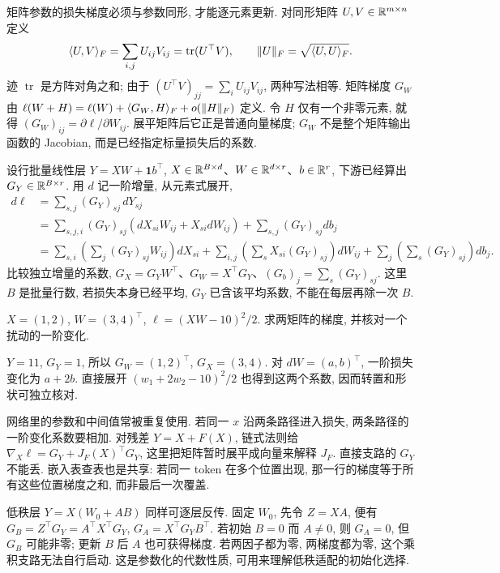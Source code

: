 \label{sec:frobenius}
矩阵参数的损失梯度必须与参数同形, 才能逐元素更新. 对同形矩阵 $U,V\in\mathbb R^{m\times n}$ 定义
\[
\langle U,V\rangle_F=\sum_{i,j}U_{ij}V_{ij}
=\operatorname{tr}(U^\top V),\qquad \lVert U\rVert_F=\sqrt{\langle U,U\rangle_F}.
\]
迹 $\operatorname{tr}$ 是方阵对角之和; 由于 $(U^\top V)_{jj}=\sum_iU_{ij}V_{ij}$, 两种写法相等. 矩阵梯度 $G_W$ 由
$\ell(W+H)=\ell(W)+\langle G_W,H\rangle_F+o(\lVert H\rVert_F)$
定义. 令 $H$ 仅有一个非零元素, 就得 $(G_W)_{ij}=\partial\ell/\partial W_{ij}$. 展平矩阵后它正是普通向量梯度; $G_W$ 不是整个矩阵输出函数的 Jacobian, 而是已经指定标量损失后的系数.

设行批量线性层 $Y=XW+\mathbf1b^\top$, $X\in\mathbb R^{B\times d}$、$W\in\mathbb R^{d\times r}$、$b\in\mathbb R^r$, 下游已经算出 $G_Y\in\mathbb R^{B\times r}$. 用 $d$ 记一阶增量, 从元素式展开,
\begin{align*}
d\ell&=\sum_{s,j}(G_Y)_{sj}\,dY_{sj}\\
&=\sum_{s,j,i}(G_Y)_{sj}(dX_{si}W_{ij}+X_{si}dW_{ij})
 +\sum_{s,j}(G_Y)_{sj}db_j\\
&=\sum_{s,i}\left(\sum_j(G_Y)_{sj}W_{ij}\right)dX_{si}
+\sum_{i,j}\left(\sum_sX_{si}(G_Y)_{sj}\right)dW_{ij}
+\sum_j\left(\sum_s(G_Y)_{sj}\right)db_j.
\end{align*}
比较独立增量的系数,
$G_X=G_YW^\top$、$G_W=X^\top G_Y$、$(G_b)_j=\sum_s(G_Y)_{sj}$.
这里 $B$ 是批量行数, 若损失本身已经平均, $G_Y$ 已含该平均系数, 不能在每层再除一次 $B$.

\begin{example}
$X=(1,2)$, $W=(3,4)^\top$, $\ell=(XW-10)^2/2$. 求两矩阵的梯度, 并核对一个扰动的一阶变化.
\end{example}
\begin{solution}
$Y=11$, $G_Y=1$, 所以 $G_W=(1,2)^\top$, $G_X=(3,4)$. 对 $dW=(a,b)^\top$, 一阶损失变化为 $a+2b$. 直接展开 $(w_1+2w_2-10)^2/2$ 也得到这两个系数, 因而转置和形状可独立核对.
\end{solution}
网络里的参数和中间值常被重复使用. 若同一 $x$ 沿两条路径进入损失, 两条路径的一阶变化系数要相加. 对残差 $Y=X+F(X)$, 链式法则给
$\nabla_X\ell=G_Y+J_F(X)^\top G_Y$, 这里把矩阵暂时展平成向量来解释 $J_F$. 直接支路的 $G_Y$ 不能丢. 嵌入表查表也是共享: 若同一 token 在多个位置出现, 那一行的梯度等于所有这些位置梯度之和, 而非最后一次覆盖.

低秩层 $Y=X(W_0+AB)$ 同样可逐层反传. 固定 $W_0$, 先令 $Z=XA$, 便有
$G_B=Z^\top G_Y=A^\top X^\top G_Y$,
$G_A=X^\top G_YB^\top$.
若初始 $B=0$ 而 $A\ne0$, 则 $G_A=0$, 但 $G_B$ 可能非零; 更新 $B$ 后 $A$ 也可获得梯度. 若两因子都为零, 两梯度都为零, 这个乘积支路无法自行启动. 这是参数化的代数性质, 可用来理解低秩适配的初始化选择.

